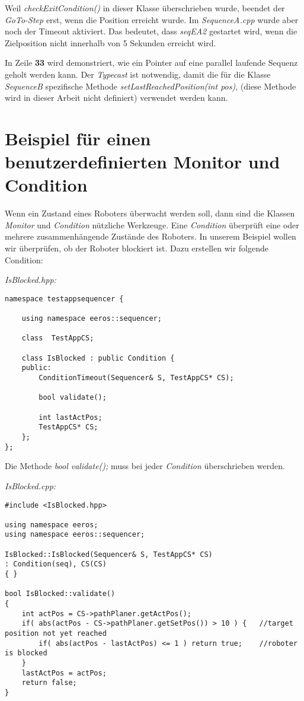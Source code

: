 Weil \textit{checkExitCondition()} in dieser Klasse überschrieben wurde, beendet der \textit{GoTo-Step} erst, wenn die Position erreicht wurde.
Im \textit{SequenceA.cpp} wurde aber noch der Timeout aktiviert.
Das bedeutet, dass \textit{seqEA2} gestartet wird, wenn die Zielposition nicht innerhalb von 5 Sekunden erreicht wird.

In Zeile \textbf{33} wird demonstriert, wie ein Pointer auf eine parallel laufende Sequenz geholt werden kann.
Der \textit{Typecast} ist notwendig, damit die für die Klasse \textit{SequenceB} spezifische Methode \textit{setLastReachedPosition(int pos)}, (diese Methode wird in dieser Arbeit nicht definiert) verwendet werden kann.



\section{Beispiel für einen benutzerdefinierten Monitor und Condition}
\label{monitorUndCondition}
Wenn ein Zustand eines Roboters überwacht werden soll, dann sind die Klassen \textit{Monitor} und \textit{Condition} nützliche Werkzeuge.
Eine \textit{Condition} überprüft eine oder mehrere zusammenhängende Zustände des Roboters.
In unserem Beispiel wollen wir überprüfen, ob der Roboter blockiert ist.
Dazu erstellen wir folgende Condition:

\textit{IsBlocked.hpp:}\
\begin{lstlisting}
namespace testappsequencer {
	
	using namespace eeros::sequencer;
	
	class  TestAppCS;
	
	class IsBlocked : public Condition {
	public:
		ConditionTimeout(Sequencer& S, TestAppCS* CS);
		
		bool validate();
		
		int lastActPos;
		TestAppCS* CS;
	};
};		
\end{lstlisting}

Die Methode \textit{bool validate();} muss bei jeder \textit{Condition} überschrieben werden.


\textit{IsBlocked.cpp:}\
\begin{lstlisting}
#include <IsBlocked.hpp>

using namespace eeros;
using namespace eeros::sequencer;

IsBlocked::IsBlocked(Sequencer& S, TestAppCS* CS)
: Condition(seq), CS(CS)
{ }

bool IsBlocked::validate()
{
	int actPos = CS->pathPlaner.getActPos();
	if( abs(actPos - CS->pathPlaner.getSetPos()) > 10 ) {	//target position not yet reached
		if( abs(actPos - lastActPos) <= 1 ) return true;	//roboter is blocked
	}
	lastActPos = actPos;	
	return false;
}
\end{lstlisting}

